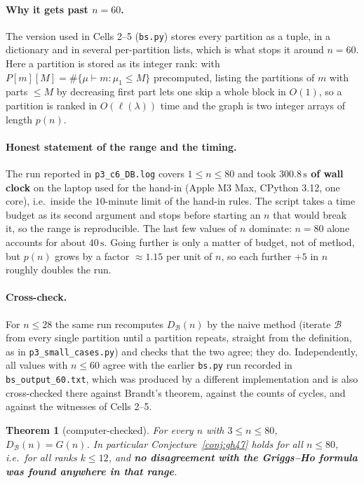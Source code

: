 \documentclass[11pt]{article}
\newtheorem{theorem}{Theorem}[section]
\theoremstyle{definition}
\newcommand{\B}{\mathcal{B}}
\newcommand{\DB}{D_{\mathcal{B}}}
\renewcommand{\le}{\leqslant}
\newcommand{\NMAX}{80}
\newcommand{\KMAX}{12}
\newcommand{\TOTALSEC}{300.8\,\mathrm{s}}
\newcommand{\LASTSEC}{40\,\mathrm{s}}
\newcommand{\LAPTOP}{Apple M3 Max, CPython 3.12, one core}
\begin{document}
\paragraph{Why it gets past $n=60$.}  The version used in Cells 2--5 (\texttt{bs.py}) stores every partition as a
tuple, in a dictionary and in several per-partition lists, which is what stops it around $n=60$.  Here a partition is stored as its integer rank: with
$P[m][M]=\#\{\mu\vdash m:\mu_1\le M\}$ precomputed, listing the partitions of $m$ with parts $\le M$ by decreasing
first part lets one skip a whole block in $O(1)$, so a partition is ranked in $O(\ell(\lambda))$ time and the graph
is two integer arrays of length $p(n)$.

\paragraph{Honest statement of the range and the timing.}  The run reported in \texttt{p3\_c6\_DB.log} covers
$1\le n\le\NMAX$ and took \textbf{$\TOTALSEC$ of wall clock} on the laptop used for the hand-in
(\LAPTOP), i.e.\ inside the $10$-minute limit of the hand-in rules.  The script takes a time budget as
its second argument and stops before starting an $n$ that would break it, so the range is reproducible.  The last
few values of $n$ dominate: $n=\NMAX$ alone accounts for about $\LASTSEC$.  Going further is only a matter of
budget, not of method, but $p(n)$ grows by a factor $\approx1.15$ per unit of $n$, so each further $+5$ in $n$
roughly doubles the run.

\paragraph{Cross-check.}  For $n\le28$ the same run recomputes $\DB(n)$ by the naive method (iterate $\B$ from every
single partition until a partition repeats, straight from the definition, as in \texttt{p3\_small\_cases.py}) and
checks that the two agree; they do.  Independently, all values with $n\le60$ agree with the earlier
\texttt{bs.py} run recorded in \texttt{bs\_output\_60.txt}, which was produced by a different implementation and is
also cross-checked there against Brandt's theorem, against the counts of cycles, and against the witnesses of
Cells 2--5.

\begin{theorem}[computer-checked]\label{thm:comp}
For every $n$ with $3\le n\le\NMAX$, $\DB(n)=G(n)$.  In particular Conjecture~\ref{conj:gh47} holds for all
$n\le\NMAX$, i.e.\ for all ranks $k\le\KMAX$, and \textbf{no disagreement with the Griggs--Ho formula was found
anywhere in that range}.
\end{theorem}
\end{document}

